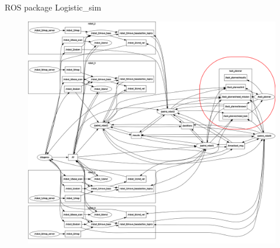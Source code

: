     \begin{frame}[fragile]{ROS package Logistic\_sim}
        \begin{figure}[hbt]
            \centering
            \includegraphics[scale=0.12]{img/rosgraph}
        \end{figure}
    \end{frame}

